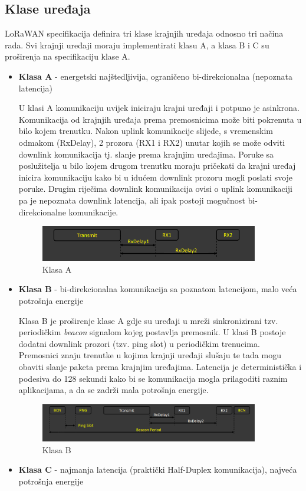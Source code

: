 \subsection{Klase uređaja}
\label{subection:classes}
LoRaWAN specifikacija definira tri klase krajnjih uređaja odnosno tri načina rada. Svi krajnji uređaji moraju implementirati klasu A, a klasa B i C su proširenja na specifikaciju klase A.
\begin{itemize}
\item \textbf{Klasa A} - energetski najštedljivija, ograničeno bi-direkcionalna (nepoznata latencija)

U klasi A komunikaciju uvijek iniciraju krajni uređaji i potpuno je asinkrona. Komunikacija od krajnjih uređaja prema premosnicima može biti pokrenuta u bilo kojem trenutku. Nakon uplink komunikacije slijede, s vremenskim odmakom (RxDelay), 2 prozora (RX1 i RX2) unutar kojih se može odviti downlink komunikacija tj. slanje prema krajnjim uređajima. Poruke sa poslužitelja u bilo kojem drugom trenutku moraju pričekati da krajni uređaj inicira komunikaciju kako bi u idućem downlink prozoru mogli poslati svoje poruke. Drugim riječima downlink komunikacija ovisi o uplink komunikaciji pa je nepoznata downlink latencija, ali ipak postoji mogučnost bi-direkcionalne komunikacije.
\begin{figure}[ht!]
	\centering
	\includegraphics[width=0.9\textwidth]{images/a_class.png}
	\caption{Klasa A}
	\label{img:class_a}
\end{figure}
\newpage
\item \textbf{Klasa B} - bi-direkcionalna komunikacija sa poznatom latencijom, malo veća potrošnja energije

Klasa B je proširenje klase A gdje su uređaji u mreži sinkronizirani tzv. periodičkim \textit{beacon} signalom kojeg postavlja premosnik. U klasi B postoje dodatni downlink prozori (tzv. ping slot) u periodičkim trenucima. Premosnici znaju trenutke u kojima krajnji uređaji slušaju te tada mogu obaviti slanje paketa prema krajnjim uređajima. Latencija je deterministička i podesiva do 128 sekundi kako bi se komunikacija mogla prilagoditi raznim aplikacijama, a da se zadrži mala potrošnja energije.
\begin{figure}[ht!]
	\centering
	\includegraphics[width=0.9\textwidth]{images/b_class.png}
	\caption{Klasa B}
	\label{img:class_b}
\end{figure}
\item \textbf{Klasa C} - najmanja latencija (praktički Half-Duplex komunikacija), najveća potrošnja energije


\end{itemize}

